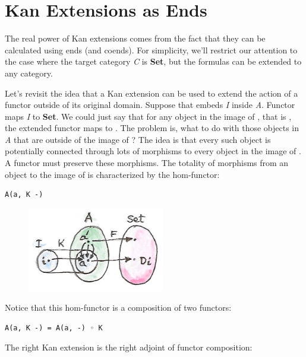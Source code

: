 \section{Kan Extensions as Ends}\label{kan-extensions-as-ends}

The real power of Kan extensions comes from the fact that they can be
calculated using ends (and coends). For simplicity, we'll restrict our
attention to the case where the target category \emph{C} is
\textbf{Set}, but the formulas can be extended to any category.

Let's revisit the idea that a Kan extension can be used to extend the
action of a functor outside of its original domain. Suppose that
 embeds \emph{I} inside \emph{A}. Functor  maps
\emph{I} to \textbf{Set}. We could just say that for any object
 in the image of , that is , the
extended functor maps  to . The problem is, what
to do with those objects in \emph{A} that are outside of the image of
? The idea is that every such object is potentially connected
through lots of morphisms to every object in the image of . A
functor must preserve these morphisms. The totality of morphisms from an
object  to the image of  is characterized by the
hom-functor:

\begin{Verbatim}[commandchars=\\\{\}]
A(a, K -)
\end{Verbatim}

\begin{figure}[H]
\centering
\includegraphics[width=60mm]{images/kan13.jpg}
\end{figure}

\noindent
Notice that this hom-functor is a composition of two functors:

\begin{Verbatim}[commandchars=\\\{\}]
A(a, K -) = A(a, -) ◦ K
\end{Verbatim}
The right Kan extension is the right adjoint of functor composition:

